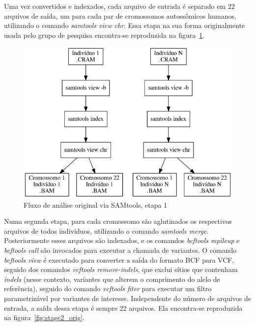 \documentclass[cic,tc]{iiufrgs}
\begin{document}
Uma vez convertidos e indexados, cada arquivo de entrada é separado em 22
arquivos de saída, um para cada par de cromossomos autossômicos humanos,
utilizando o comando \textit{samtools view chr}. Essa etapa na sua forma
originalmente usada pelo grupo de pesquisa encontra-se reproduzida na
figura~\ref{fig:stage1_orig}.

\begin{figure}
  \caption{Fluxo de análise original via SAMtools, etapa 1}
    \begin{center}
      \includegraphics[width=0.85\linewidth]{img/stage1_orig.png}
    \end{center}
    \label{fig:stage1_orig}
\end{figure}

Numa segunda etapa, para cada cromossomo são aglutinados os respectivos
arquivos de todos indivíduos, utilizando o comando \textit{samtools merge}.
Posteriormente esses arquivos são indexados, e os comandos \textit{bcftools
mpileup} e \textit{bcftools call} são invocados para executar a chamada de
variantes. O comando \textit{bcftools view} é executado para converter a saída
do formato BCF para VCF, seguido dos comandos \textit{vcftools remove-indels},
que exclui sítios que contenham \textit{indels} (nesse contexto, variantes que
alterem o comprimento do alelo de referência), seguido do comando
\textit{vcftools fiter} para executar um filtro parametrizável por variantes de
interesse. Independente do número de arquivos de entrada, a saída dessa etapa é
sempre 22 arquivos. Ela encontra-se reproduzida na
figura~\ref{fig:stage2_orig}.
\end{document}

